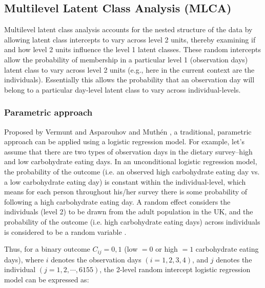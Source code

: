 
\subsection{Multilevel Latent Class Analysis (MLCA)}\vspace{-0.3cm}


Multilevel latent class analysis accounts for the nested structure of the data by allowing latent class intercepts to vary across level 2 units, thereby examining if and how level 2 units influence the level 1 latent classes. These random intercepts allow the probability of membership in a particular level 1 (observation days) latent class to vary across level 2 units (e.g., here in the current context are the individuals). Essentially this allows the probability that an observation day will belong to a
particular day-level latent class to vary across individual-levels.\vspace{-0.5cm}

\subsubsection{Parametric approach}\vspace{-0.3cm}

Proposed by Vermunt \parencite{Vermunt, vermunt2008latent} and Asparouhov and Muth\'en \parencite{muthen2009multilevel},  a traditional, parametric approach can be applied using a logistic regression model. For example, let's assume that there are two types of observation days in the dietary survey--high and low carbohydrate eating days. In an unconditional logistic regression model, the probability of the outcome (i.e. an observed high carbohydrate eating day vs. a low carbohydrate eating day) is constant within the individual-level, which means for each person throughout his/her survey there is some probability of following a high carbohydrate eating day. A random effect considers the individuals (level 2) to be drawn from the adult population in the UK, and the probability of the outcome (i.e. high carbohydrate eating days) across individuals is considered to be a random variable \parencite{snijders2011multilevel}. 

Thus, for a binary outcome $C_{ij} = 0, 1$ (low $=0$ or high $=1$ carbohydrate eating days), where $i$ denotes the observation days $(i = 1, 2, 3, 4)$, and $j$ denotes the individual $(j = 1, 2, \cdots, 6155)$, the 2-level random intercept logistic regression model can be expressed as:\vspace{-0.4cm}


